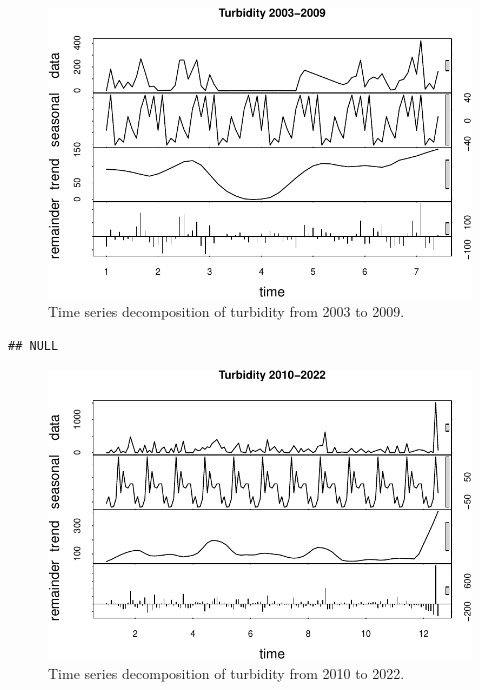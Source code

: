 \documentclass[
  12pt,
]{article}
\begin{document}
\begin{figure}

{\centering \includegraphics{Fischer_WDA_FinalProject_files/figure-latex/Plot of Early Turbidity Time Series Decomposition-1} 

}

\caption{Time series decomposition of turbidity from 2003 to 2009.}\label{fig:Plot of Early Turbidity Time Series Decomposition}
\end{figure}

\begin{verbatim}
## NULL
\end{verbatim}

\begin{figure}

{\centering \includegraphics{Fischer_WDA_FinalProject_files/figure-latex/Plot of Late Turbidity Time Series Decomposition-1} 

}

\caption{Time series decomposition of turbidity from 2010 to 2022.}\label{fig:Plot of Late Turbidity Time Series Decomposition}
\end{figure}
\end{document}
